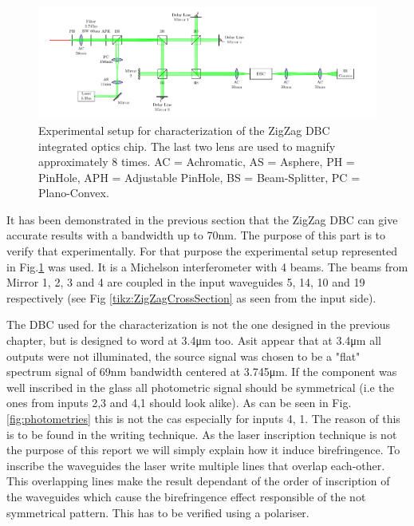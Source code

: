 \begin{figure}[htbp!]
 \centering
 \includegraphics[scale=.53]{../figures/montage.pdf}
 \caption{Experimental setup for characterization of the ZigZag DBC integrated optics chip. The last two lens are used to magnify approximately 8 times. AC = Achromatic, AS = Asphere, PH = PinHole, APH = Adjustable PinHole, BS = Beam-Splitter, PC = Plano-Convex.}
 \label{fig:expersetup}
\end{figure}
 
It has been demonstrated in the previous section that the ZigZag DBC can give accurate results with a bandwidth up to 70nm. The purpose of this part is to verify that experimentally. 
For that purpose the experimental setup represented in Fig.\ref{fig:expersetup} was used. It is a Michelson interferometer with 4 beams. The beams from Mirror 1, 2, 3 and 4 are coupled in the input waveguides 5, 14, 10 and 19 respectively (see Fig \ref{tikz:ZigZagCrossSection} as seen from the input side). 

The DBC used for the characterization is not the one designed in the previous chapter, but is designed to word at 3.4\si{\micro\meter} too. Asit appear that at 3.4\si{\micro\meter} all outputs were not illuminated, the source signal was chosen to be a "flat" spectrum signal of 69nm bandwidth centered at 3.745\si{\micro\meter}. If the component was well inscribed in the glass all photometric signal should be symmetrical (i.e the ones from inputs 2,3 and 4,1 should look alike). As can be seen in Fig.\ref{fig:photometries} this is not the cas especially for inputs 4, 1. The reason of this is to be found in the writing technique. As the laser inscription technique is not the purpose of this report we will simply explain how it induce birefringence. To inscribe the waveguides the laser write multiple lines that overlap each-other. This overlapping lines make the result dependant of the order of inscription of the waveguides which cause the birefringence effect responsible of the not symmetrical pattern. This has to be verified using a polariser.

